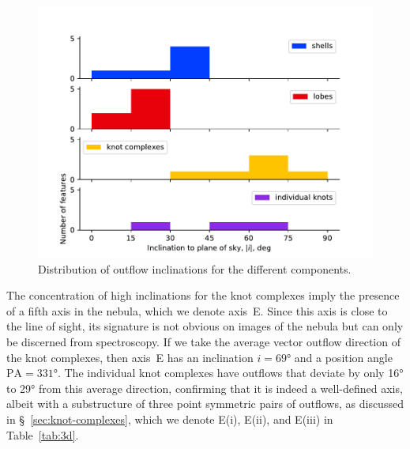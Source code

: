 \documentclass[useAMS, usenatbib]{mnras}
\begin{document}
\begin{figure}
  \centering
  \includegraphics[width=\linewidth]{figs/turtle-inclination-histogram}
  \caption{Distribution of outflow inclinations for the different components.}
  \label{fig:inclinations}
\end{figure}

The concentration of high inclinations for the knot complexes imply the presence of a fifth axis in the nebula, which we denote axis~E.
Since this axis is close to the line of sight,
its signature is not obvious on images of the nebula but can only be discerned from spectroscopy.
If we take the average vector outflow direction of the knot complexes,
then axis~E has an inclination \(i = \ang{69}\)
and a position angle \(\mathrm{PA} = \ang{331}\).
The individual knot complexes have outflows that deviate by only \ang{16} to \ang{29} from this average direction,
confirming that it is indeed a well-defined axis,
albeit with a substructure of three point symmetric pairs of outflows,
as discussed in \S~\ref{sec:knot-complexes},
which we denote E(i), E(ii), and E(iii) in Table~\ref{tab:3d}.
\end{document}
